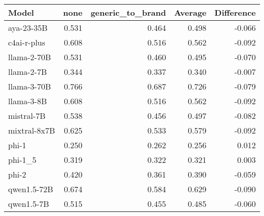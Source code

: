\begin{tabular}{lrrrr}
\toprule
Model & none & generic_to_brand & Average & Difference \\
\midrule
aya-23-35B & 0.531 & 0.464 & 0.498 & -0.066 \\
c4ai-r-plus & 0.608 & 0.516 & 0.562 & -0.092 \\
llama-2-70B & 0.531 & 0.460 & 0.495 & -0.070 \\
llama-2-7B & 0.344 & 0.337 & 0.340 & -0.007 \\
llama-3-70B & 0.766 & 0.687 & 0.726 & -0.079 \\
llama-3-8B & 0.608 & 0.516 & 0.562 & -0.092 \\
mistral-7B & 0.538 & 0.456 & 0.497 & -0.082 \\
mixtral-8x7B & 0.625 & 0.533 & 0.579 & -0.092 \\
phi-1 & 0.250 & 0.262 & 0.256 & 0.012 \\
phi-1_5 & 0.319 & 0.322 & 0.321 & 0.003 \\
phi-2 & 0.420 & 0.361 & 0.390 & -0.059 \\
qwen1.5-72B & 0.674 & 0.584 & 0.629 & -0.090 \\
qwen1.5-7B & 0.515 & 0.455 & 0.485 & -0.060 \\
\bottomrule
\end{tabular}
